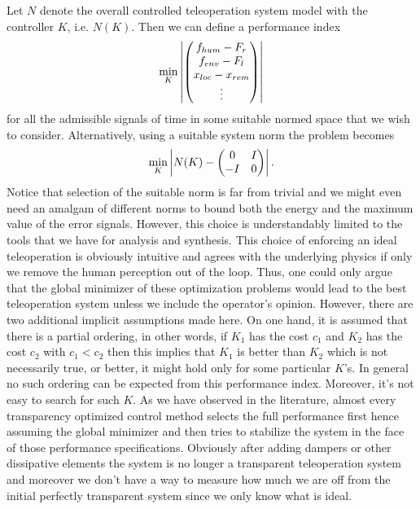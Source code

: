 Let $N$ denote the overall controlled teleoperation system model with the controller $K$, i.e. $N(K)$. Then we can 
define a performance index
\[
\min_K \displaystyle \left|\begin{pmatrix}f_{hum}-F_{r}\\f_{env}-F_{l}\\x_{loc}-x_{\vphantom{l}rem}\\\vdots\end{pmatrix}\right| 
\]
for all the admissible signals of time in some suitable normed space that we wish to consider. Alternatively, using a suitable system norm 
the problem becomes
\[
\min_K \displaystyle \left|N(K) - \begin{pmatrix}0&I\\-I&0\end{pmatrix}\right|.
\]
Notice that selection of the suitable norm is far from trivial and we might even need an amalgam of different norms to bound both the energy
and the maximum value of the error signals. However, this choice is understandably limited to the tools that we have for analysis and 
synthesis. This choice of enforcing an ideal teleoperation is obviously intuitive and agrees with the underlying physics if only we remove 
the human perception out of the loop. Thus, one could only argue that the global minimizer of these optimization problems would lead to the best 
teleoperation system unless we include the operator's opinion. However, there are two additional implicit assumptions made here. On one hand, 
it is assumed that there is a partial ordering, in other words, if $K_1$ has the cost $c_1$ and $K_2$ has the cost $c_2$ with $c_1<c_2$ 
then this implies that $K_1$ is better than $K_2$ which is not necessarily true, or better, it might hold only for some particular $K$'s. 
In general no such ordering can be expected from this performance index. Moreover, it's not easy to search for such $K$. As we have observed 
in the literature, almost every transparency optimized control method selects the full performance first hence assuming the global minimizer 
and then tries to stabilize the system in the face of those performance specifications. Obviously after adding dampers or other dissipative 
elements the system is no longer a transparent teleoperation system and moreover we don't have a way to measure how much we are off from the 
initial perfectly transparent system since we only know what is ideal. 

